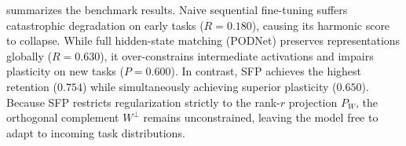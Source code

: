  summarizes the benchmark results.
Naive sequential fine-tuning suffers catastrophic degradation on early tasks ($R = 0.180$), causing its harmonic score to collapse.
While full hidden-state matching (PODNet) preserves representations globally ($R = 0.630$), it over-constrains intermediate activations and impairs plasticity on new tasks ($P = 0.600$).
In contrast, SFP achieves the highest retention ($0.754$) while simultaneously achieving superior plasticity ($0.650$).
Because SFP restricts regularization strictly to the rank-$r$ projection $P_W$, the orthogonal complement $W^\perp$ remains unconstrained, leaving the model free to adapt to incoming task distributions.
